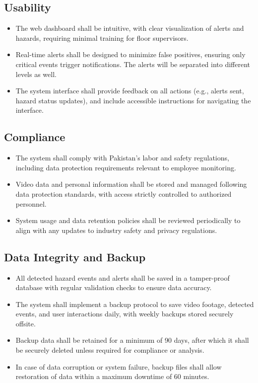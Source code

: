 \documentclass[12pt]{article}
\begin{document}
\subsection*{Usability}
\begin{itemize}
    \item The web dashboard shall be intuitive, with clear visualization of alerts and hazards, requiring minimal training for floor supervisors.
    \item Real-time alerts shall be designed to minimize false positives, ensuring only critical events trigger notifications. The alerts will be separated into different levels as well.
    \item The system interface shall provide feedback on all actions (e.g., alerts sent, hazard status updates), and include accessible instructions for navigating the interface.
\end{itemize}

\subsection*{Compliance}
\begin{itemize}
    \item The system shall comply with Pakistan’s labor and safety regulations, including data protection requirements relevant to employee monitoring.
    \item Video data and personal information shall be stored and managed following data protection standards, with access strictly controlled to authorized personnel.
    \item System usage and data retention policies shall be reviewed periodically to align with any updates to industry safety and privacy regulations.
\end{itemize}

\subsection*{Data Integrity and Backup}
\begin{itemize}
    \item All detected hazard events and alerts shall be saved in a tamper-proof database with regular validation checks to ensure data accuracy.
    \item The system shall implement a backup protocol to save video footage, detected events, and user interactions daily, with weekly backups stored securely offsite.
    \item Backup data shall be retained for a minimum of 90 days, after which it shall be securely deleted unless required for compliance or analysis.
    \item In case of data corruption or system failure, backup files shall allow restoration of data within a maximum downtime of 60 minutes.
\end{itemize}
\end{document}
